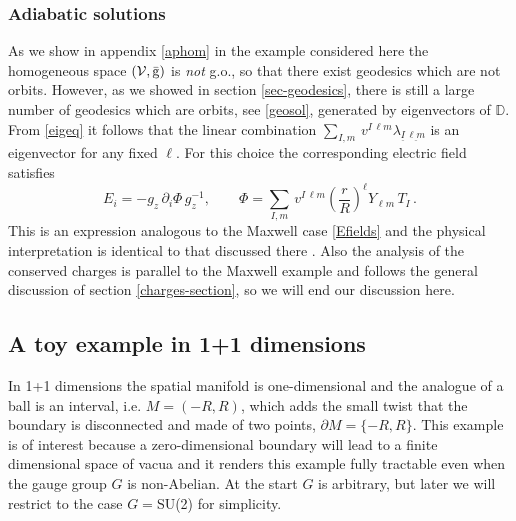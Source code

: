 \documentclass[11pt,a4paper]{article}
\def\calv{{\cal V}}
\def\ulm{{\underline{\ell m}}}
\def\uI{{\underline{I}}}
\def\rg{{\mathrm{g}}}
\def\Dperp{{\mathbb{D}}}
\begin{document}
    \subsubsection{Adiabatic solutions}
    As we show in appendix \ref{aphom} in the example considered here the homogeneous space $(\calv,\bar\rg)$ is {\it not} g.o., so that there exist geodesics which are not orbits. However, as we showed in section \ref{sec-geodesics}, there is still a large number of geodesics which are orbits, see \eqref{geosol}, generated by eigenvectors of $\Dperp$. From \eqref{eigeq} it follows that the linear combination $\sum_{I,m}\,v^{I\,\ell m} \lambda_{\uI\,\ulm}$ is an eigenvector for any fixed $\ell$. For this choice the corresponding electric field satisfies
    \begin{equation}
     E_i=- g_z \,\partial_i\Phi \,g_z^{-1}, \qquad \Phi=\sum_{I,m}\,v^{I\,\ell m}\left(\frac{r}{R}\right)^\ell Y_{\ell m}\,T_I\label{EfieldsYM}  \,.
    \end{equation}
    This is an expression analogous to the Maxwell case \eqref{Efields} and the physical interpretation is identical to that discussed there . Also the analysis of the conserved charges is parallel to the Maxwell example and follows the general discussion of section \ref{charges-section}, so we will end our discussion here.


    \subsection{A toy example in 1+1 dimensions}\label{toyex}
    In 1+1 dimensions the spatial manifold is one-dimensional and the analogue of a ball is an interval, i.e. $M=(-R,R)$, which adds the small twist that the boundary is disconnected and made of two points, $\partial M=\{-R,R\}$. This example is of interest because a zero-dimensional boundary will lead to a finite dimensional space of vacua and it renders this example fully tractable even when the gauge group $G$ is non-Abelian. At the start  $G$ is arbitrary, but later we will restrict to the case $G=$SU(2) for simplicity.
    
\end{document}
